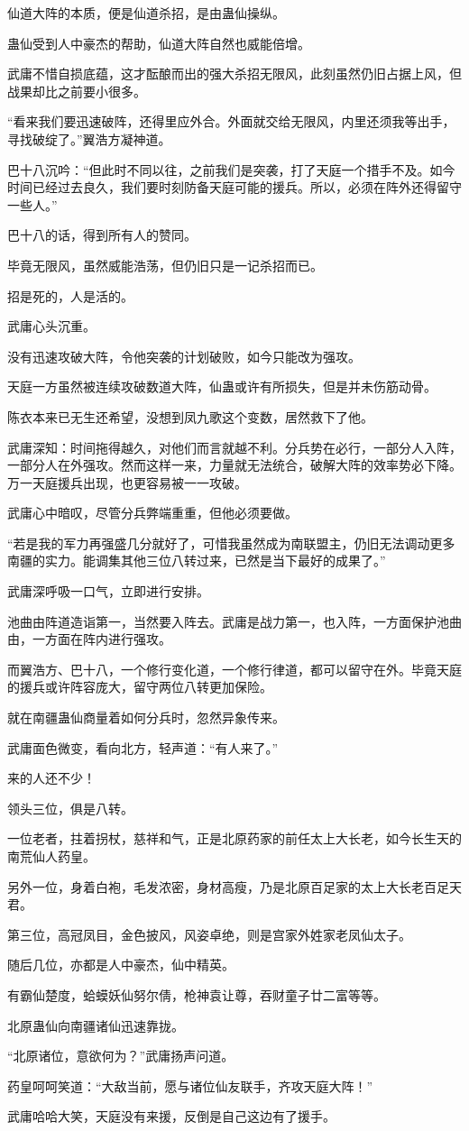 \begin{this_body}
仙道大阵的本质，便是仙道杀招，是由蛊仙操纵。

蛊仙受到人中豪杰的帮助，仙道大阵自然也威能倍增。

武庸不惜自损底蕴，这才酝酿而出的强大杀招无限风，此刻虽然仍旧占据上风，但战果却比之前要小很多。

“看来我们要迅速破阵，还得里应外合。外面就交给无限风，内里还须我等出手，寻找破绽了。”翼浩方凝神道。

巴十八沉吟：“但此时不同以往，之前我们是突袭，打了天庭一个措手不及。如今时间已经过去良久，我们要时刻防备天庭可能的援兵。所以，必须在阵外还得留守一些人。”

巴十八的话，得到所有人的赞同。

毕竟无限风，虽然威能浩荡，但仍旧只是一记杀招而已。

招是死的，人是活的。

武庸心头沉重。

没有迅速攻破大阵，令他突袭的计划破败，如今只能改为强攻。

天庭一方虽然被连续攻破数道大阵，仙蛊或许有所损失，但是并未伤筋动骨。

陈衣本来已无生还希望，没想到凤九歌这个变数，居然救下了他。

武庸深知：时间拖得越久，对他们而言就越不利。分兵势在必行，一部分人入阵，一部分人在外强攻。然而这样一来，力量就无法统合，破解大阵的效率势必下降。万一天庭援兵出现，也更容易被一一攻破。

武庸心中暗叹，尽管分兵弊端重重，但他必须要做。

“若是我的军力再强盛几分就好了，可惜我虽然成为南联盟主，仍旧无法调动更多南疆的实力。能调集其他三位八转过来，已然是当下最好的成果了。”

武庸深呼吸一口气，立即进行安排。

池曲由阵道造诣第一，当然要入阵去。武庸是战力第一，也入阵，一方面保护池曲由，一方面在阵内进行强攻。

而翼浩方、巴十八，一个修行变化道，一个修行律道，都可以留守在外。毕竟天庭的援兵或许阵容庞大，留守两位八转更加保险。

就在南疆蛊仙商量着如何分兵时，忽然异象传来。

武庸面色微变，看向北方，轻声道：“有人来了。”

来的人还不少！

领头三位，俱是八转。

一位老者，拄着拐杖，慈祥和气，正是北原药家的前任太上大长老，如今长生天的南荒仙人药皇。

另外一位，身着白袍，毛发浓密，身材高瘦，乃是北原百足家的太上大长老百足天君。

第三位，高冠凤目，金色披风，风姿卓绝，则是宫家外姓家老凤仙太子。

随后几位，亦都是人中豪杰，仙中精英。

有霸仙楚度，蛤蟆妖仙努尔倩，枪神袁让尊，吞财童子廿二富等等。

北原蛊仙向南疆诸仙迅速靠拢。

“北原诸位，意欲何为？”武庸扬声问道。

药皇呵呵笑道：“大敌当前，愿与诸位仙友联手，齐攻天庭大阵！”

武庸哈哈大笑，天庭没有来援，反倒是自己这边有了援手。

\end{this_body}

